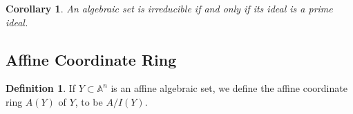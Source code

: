 \documentclass[11pt]{book}
\newtheorem{corollary}[theorem]{Corollary}
\theoremstyle{definition}
\newtheorem{definition}[theorem]{Definition}
\numberwithin{equation}{section}
\begin{document}
\begin{thmbox}
    \begin{corollary}
        \label{cor:ideal_correspondence}
        An algebraic set is irreducible if and only if its ideal is a prime ideal.
    \end{corollary}
\end{thmbox}

\newpage
\subsection*{Affine Coordinate Ring}

\begin{defbox}
    \begin{definition}
        \label{def:affine_coordinate_ring}
        If \(Y \subset \mathbb{A}^n\) is an affine algebraic set, we define the affine coordinate ring \(A(Y)\) of \(Y\), to be \(A / I(Y)\). 
    \end{definition}
\end{defbox}

\newpage
\end{document}
